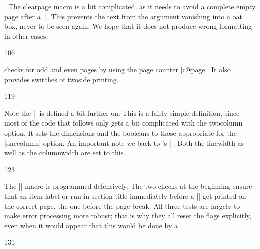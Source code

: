 \begin{multicols}{2}
. The clearpage macro is a bit complicated, as it needs to avoid a complete empty page after a |\twocolumn[..]|. This prevents the text from the argument
vanishing into a 
oat box, never to be seen again. We hope that it does not
produce wrong formatting in other cases.

\begin{Code}
106 \def\clearpage{%
107 \ifvmode
108 \ifnum \@dbltopnum =\m@ne
109 \ifdim \pagetotal <\topskip
110 \hbox{}%
111 \fi
112 \fi
113 \fi
114 \newpage
115 \write\m@ne{}%
116 \vbox{}%
117 \penalty -\@Mi
118 }
\end{Code}

 checks for odd and even pages by using the
page counter |c@page|.  It also provides switches of twoside printing. 

\begin{Code}
119 \def\cleardoublepage{\clearpage\if@twoside \ifodd\c@page\else
120 \hbox{}\newpage\if@twocolumn\hbox{}\newpage\fi\fi\fi}
\end{Code}

Note the |\newpage| is defined a bit further on. This is a fairly simple definition, since most of the code that follows only gets a bit complicated with the twocolumn option. It sets the dimensions and the booleans to those appropriate for the |onecolumn| option. An important note we back to \tex's |\hsize|. Both the linewidth as well as the columnwidth are set to this.

\begin{Code}
123 \def\onecolumn{%
124   \clearpage
125   \global\columnwidth\textwidth
126   \global\hsize\columnwidth
127   \global\linewidth\columnwidth
128   \global\@twocolumnfalse
129   \col@number \@ne
130   \@floatplacement
     }
\end{Code}

 The |\newpage| macro is programmed defensively. The two checks at the beginning ensure that an item label or run-in section title
immediately before a |\newpage| get printed on the correct page, the one before
the page break.
All three tests are largely to make error processing more robust; that is why
they all reset the 
flags explicitly, even when it would appear that this would be
done by a |\leavevmode|.

\begin{Code}
131 \def \newpage {%
132  \if@noskipsec
133    \ifx \@nodocument\relax
134      \leavevmode
135      \global \@noskipsecfalse
136    \fi
137 \fi
138 \if@inlabel
139   \leavevmode
140   \global \@inlabelfalse
141 \fi
142 \if@nobreak \@nobreakfalse \everypar{}\fi
143 \par
144 \vfil
145 \penalty -\@M}
\end{Code}


\end{multicols}
